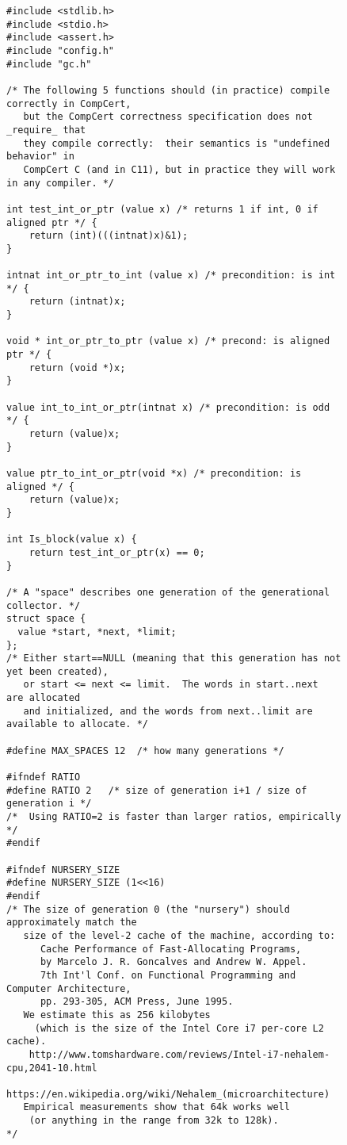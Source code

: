 
\begin{figure}[t]
\vspace{-1ex}
  \begin{lstlisting}
#include <stdlib.h>
#include <stdio.h>
#include <assert.h>
#include "config.h"
#include "gc.h"

/* The following 5 functions should (in practice) compile correctly in CompCert,
   but the CompCert correctness specification does not _require_ that
   they compile correctly:  their semantics is "undefined behavior" in
   CompCert C (and in C11), but in practice they will work in any compiler. */

int test_int_or_ptr (value x) /* returns 1 if int, 0 if aligned ptr */ {
    return (int)(((intnat)x)&1);
}

intnat int_or_ptr_to_int (value x) /* precondition: is int */ {
    return (intnat)x;
}

void * int_or_ptr_to_ptr (value x) /* precond: is aligned ptr */ {
    return (void *)x;
}

value int_to_int_or_ptr(intnat x) /* precondition: is odd */ {
    return (value)x;
}

value ptr_to_int_or_ptr(void *x) /* precondition: is aligned */ {
    return (value)x;
}

int Is_block(value x) {
    return test_int_or_ptr(x) == 0;
}

/* A "space" describes one generation of the generational collector. */
struct space {
  value *start, *next, *limit;
};
/* Either start==NULL (meaning that this generation has not yet been created),
   or start <= next <= limit.  The words in start..next  are allocated
   and initialized, and the words from next..limit are available to allocate. */

#define MAX_SPACES 12  /* how many generations */

#ifndef RATIO
#define RATIO 2   /* size of generation i+1 / size of generation i */
/*  Using RATIO=2 is faster than larger ratios, empirically */
#endif

#ifndef NURSERY_SIZE
#define NURSERY_SIZE (1<<16)
#endif
/* The size of generation 0 (the "nursery") should approximately match the
   size of the level-2 cache of the machine, according to:
      Cache Performance of Fast-Allocating Programs,
      by Marcelo J. R. Goncalves and Andrew W. Appel.
      7th Int'l Conf. on Functional Programming and Computer Architecture,
      pp. 293-305, ACM Press, June 1995.
   We estimate this as 256 kilobytes
     (which is the size of the Intel Core i7 per-core L2 cache).
    http://www.tomshardware.com/reviews/Intel-i7-nehalem-cpu,2041-10.html
    https://en.wikipedia.org/wiki/Nehalem_(microarchitecture)
   Empirical measurements show that 64k works well
    (or anything in the range from 32k to 128k).
*/


\end{lstlisting}
\end{figure}
